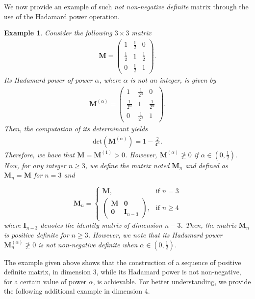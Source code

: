 \documentclass[conference,letterpaper]{IEEEtran}
\numberwithin{equation}{section}
\newcommand{\beaa}{\begin{eqnarray*}}
\newcommand{\eeaa}{\end{eqnarray*}}
\newtheorem{example}{{\sc Example}}[section]
\begin{document}
We now provide an example of such \emph{not non-negative definite} matrix through the use of the Hadamard power operation.
\medskip
\begin{example} Consider  the following $3\times 3$ matrix
\beaa
\mathbf{M}=
\begin{pmatrix}
1 & \frac{1}{2} & 0\\
\frac{1}{2} & 1 & \frac{1}{2}\\
0 & \frac{1}{2} & 1
\end{pmatrix}
.
\eeaa
Its Hadamard power of power $\alpha$, where $\alpha$ is not an integer, is given by
\beaa
\mathbf{M}^{(\alpha)}=
\begin{pmatrix}
1 & \frac{1}{2^{\alpha}} & 0\\
\frac{1}{2^{\alpha}} & 1 & \frac{1}{2^{\alpha}}\\
0 & \frac{1}{2^{\alpha}} & 1
\end{pmatrix}
.
\eeaa
 Then, the computation of its determinant yields
\beaa
\mbox{det}(\mathbf{M}^{(\alpha)})=1-\frac{2}{4^{\alpha}}.
\eeaa
Therefore, we have that $\mathbf{M}=\mathbf{M}^{(1)}>0$. 
However, $\mathbf{M}^{(\alpha)}\ngeqslant 0$ if $\alpha \in (0, \frac{1}{2}).$
Now, for any integer $n\geq 3$, we define the matrix noted $\mathbf{M}_n$ and defined as 
$\mathbf{M}_n=\mathbf{M}$ for $n=3$ and

\[
    \mathbf{M}_n= 
\begin{cases}
    \mathbf{M},& \text{if } n=3\\
    \begin{pmatrix}
\mathbf{M} & \mathbf{0}\\
\mathbf{0} & \mathbf{I}_{n-3}
\end{pmatrix},              & \text{if } n\geq 4
\end{cases}
\]
where $\mathbf{I}_{n-3}$ denotes the identity matrix of dimension $n-3$.
Then,  the matrix $\mathbf{M}_n$ is positive definite for $n\geq 3$. 
However, we note that its Hadamard power $\mathbf{M}_n^{(\alpha)}\ngeqslant 0$ is not non-negative definite when $\alpha \in (0, \frac{1}{2})$.
\end{example}

\medskip

The example given above shows that the construction of a sequence of positive definite matrix, in dimension $3$, while its Hadamard power is not non-negative, for a certain value of power $\alpha$, is achievable. 
For better understanding, we provide the following additional example in dimension $4$. 
\end{document}
